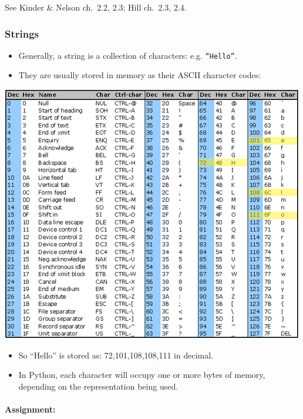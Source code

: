 \documentclass[10pt]{article}
\providecommand{\tightlist}{%
      \setlength{\itemsep}{0pt}\setlength{\parskip}{0pt}}
\begin{document}
See Kinder \& Nelson ch.~2.2, 2.3; Hill ch.~2.3, 2.4.

\hypertarget{strings}{%
\subsubsection{Strings}\label{strings}}

\begin{itemize}
\tightlist
\item
  Generally, a string is a collection of characters: e.g.
  \texttt{“Hello”}.
\item
  They are usually stored in memory as their ASCII character codes:
\end{itemize}

\includegraphics[width=0.7\linewidth]{standard-ascii-table-mod.jpg}

\begin{itemize}
\tightlist
\item
  So ``Hello'' is stored as: 72,101,108,108,111 in decimal.
\item
  In Python, each character will occupy one or more bytes of memory,
  depending on the representation being used.
\end{itemize}

\hypertarget{assignment}{%
\paragraph{Assignment:}\label{assignment}}
\end{document}
